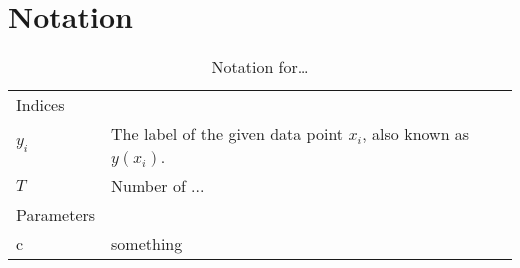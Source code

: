 \chapter*{Notation}
\label{ch:notation}


\begin{table}
    \caption{Notation for\ldots}
    \begin{tabularx}{\textwidth}{@{}XX@{}}
        \toprule
        Indices \\
        $y_i$ & The label of the given data point $x_i$, also known as $y(x_i)$. \\
        $T$ & Number of ... \\
        Parameters \\
        c   & something \\
        \bottomrule
    \end{tabularx}
\end{table}